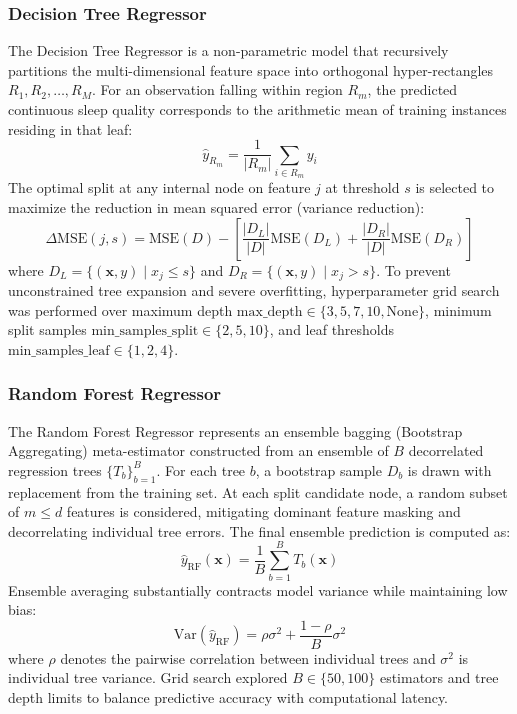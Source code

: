 \documentclass[12pt,a4paper]{article}
\begin{document}
\subsubsection{Decision Tree Regressor}
The Decision Tree Regressor is a non-parametric model that recursively partitions the multi-dimensional feature space into orthogonal hyper-rectangles $R_1, R_2, \dots, R_M$. For an observation falling within region $R_m$, the predicted continuous sleep quality corresponds to the arithmetic mean of training instances residing in that leaf:
\begin{equation}
    \hat{y}_{R_m} = \frac{1}{|R_m|} \sum_{i \in R_m} y_i
\end{equation}
The optimal split at any internal node on feature $j$ at threshold $s$ is selected to maximize the reduction in mean squared error (variance reduction):
\begin{equation}
    \Delta \text{MSE}(j, s) = \text{MSE}(D) - \left[ \frac{|D_L|}{|D|} \text{MSE}(D_L) + \frac{|D_R|}{|D|} \text{MSE}(D_R) \right]
\end{equation}
where $D_L = \{(\mathbf{x}, y) \mid x_j \le s\}$ and $D_R = \{(\mathbf{x}, y) \mid x_j > s\}$. To prevent unconstrained tree expansion and severe overfitting, hyperparameter grid search was performed over maximum depth $\text{max\_depth} \in \{3, 5, 7, 10, \text{None}\}$, minimum split samples $\text{min\_samples\_split} \in \{2, 5, 10\}$, and leaf thresholds $\text{min\_samples\_leaf} \in \{1, 2, 4\}$.

\subsubsection{Random Forest Regressor}
The Random Forest Regressor represents an ensemble bagging (Bootstrap Aggregating) meta-estimator constructed from an ensemble of $B$ decorrelated regression trees $\{T_b\}_{b=1}^B$. For each tree $b$, a bootstrap sample $D_b$ is drawn with replacement from the training set. At each split candidate node, a random subset of $m \le d$ features is considered, mitigating dominant feature masking and decorrelating individual tree errors. The final ensemble prediction is computed as:
\begin{equation}
    \hat{y}_{\text{RF}}(\mathbf{x}) = \frac{1}{B} \sum_{b=1}^B T_b(\mathbf{x})
\end{equation}
Ensemble averaging substantially contracts model variance while maintaining low bias:
\begin{equation}
    \text{Var}\left( \hat{y}_{\text{RF}} \right) = \rho \sigma^2 + \frac{1 - \rho}{B} \sigma^2
\end{equation}
where $\rho$ denotes the pairwise correlation between individual trees and $\sigma^2$ is individual tree variance. Grid search explored $B \in \{50, 100\}$ estimators and tree depth limits to balance predictive accuracy with computational latency.
\end{document}

